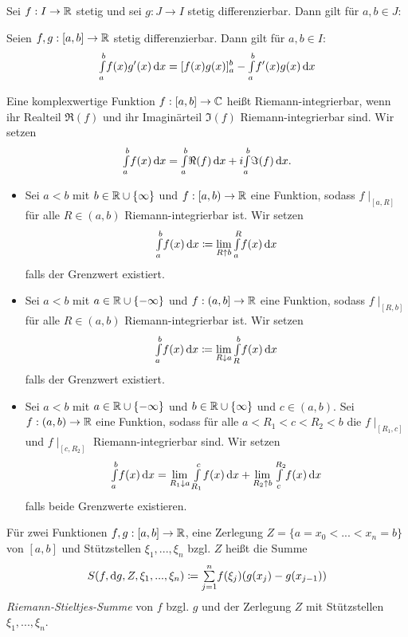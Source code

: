 \documentclass{cheat-sheet}
\begin{document}
\begin{satz}
Sei $f : I \to \mathbb{R}$ stetig und sei $g : J \to I$ stetig differenzierbar. Dann gilt für $a, b \in J$:
\end{satz}

\begin{satz}
Seien $f, g : [a, b] \to \mathbb{R}$ stetig differenzierbar. Dann gilt für $a, b \in I$:
\[ {\textstyle \int\limits_{a}^{b}} f(x)g'(x) \,\mathrm{d} x = [f(x)g(x)]_a^b - {\textstyle \int\limits_{a}^{b}} f'(x)g(x) \,\mathrm{d} x \]
\end{satz}

\begin{defn}
Eine komplexwertige Funktion $f : [a, b] \to \mathbb{C}$ heißt Riemann-integrierbar, wenn ihr Realteil $\Re(f)$ und ihr Imaginärteil $\Im(f)$ Riemann-integrierbar sind. Wir setzen
\[ {\textstyle \int\limits_{a}^{b}} f(x) \,\mathrm{d} x = {\textstyle \int\limits_{a}^{b}} \Re(f) \,\mathrm{d} x + i {\textstyle \int\limits_{a}^{b}} \Im(f) \,\mathrm{d} x. \]
\end{defn}

\begin{defn}
\begin{itemize}
  \item Sei $a < b$ mit $b \in \mathbb{R} \cup \{ \infty \}$ und $f : [a, b) \to \mathbb{R}$ eine Funktion, sodass $f\mid_[a, R]$ für alle $R \in (a, b)$ Riemann-integrierbar ist. Wir setzen
  \[ {\textstyle \int\limits_{a}^{b}} f(x) \,\mathrm{d} x \coloneqq \lim_{R \uparrow b} {\textstyle \int\limits_{a}^{R}} f(x) \,\mathrm{d} x \]
  falls der Grenzwert existiert.
  \item Sei $a < b$ mit $a \in \mathbb{R} \cup \{ -\infty \}$ und $f : (a, b] \to \mathbb{R}$ eine Funktion, sodass $f\mid_[R, b]$ für alle $R \in (a, b)$ Riemann-integrierbar ist. Wir setzen
  \[ {\textstyle \int\limits_{a}^{b}} f(x) \,\mathrm{d} x \coloneqq \lim_{R \downarrow a} {\textstyle \int\limits_{R}^{b}} f(x) \,\mathrm{d} x \]
  falls der Grenzwert existiert.
  \item Sei $a < b$ mit $a \in \mathbb{R} \cup \{ -\infty \}$ und $b \in \mathbb{R} \cup \{ \infty \}$ und $c \in (a, b)$. Sei $f : (a, b) \to \mathbb{R}$ eine Funktion, sodass für alle $a < R_1 < c < R_2 < b$ die $f\mid_{[R_1, c]}$ und $f\mid_{[c, R_2]}$ Riemann-integrierbar sind. Wir setzen
  \[ {\textstyle \int\limits_{a}^{b}} f(x) \,\mathrm{d} x = \lim_{R_1 \downarrow a} {\textstyle \int\limits_{R_1}^{c}} f(x) \,\mathrm{d} x + \lim_{R_2 \uparrow b} {\textstyle \int\limits_{c}^{R_2}} f(x) \,\mathrm{d} x \]
  falls beide Grenzwerte existieren.
\end{itemize}
\end{defn}


\begin{defn}
Für zwei Funktionen $f, g : [a, b] \to \mathbb{R}$, eine Zerlegung $Z = \{ a = x_0 < ... < x_n = b \}$ von $[a, b]$ und Stützstellen $\xi_1, ..., \xi_n$ bzgl. $Z$ heißt die Summe
\[ S(f, \d g, Z, \xi_1, ..., \xi_n) \coloneqq \sum_{j=1}^{n}\!f(\xi_j)(g(x_j) - g(x_{j{-}1})) \]
\emph{Riemann-Stieltjes-Summe} von $f$ bzgl. $g$ und der Zerlegung $Z$ mit Stützstellen $\xi_1, ..., \xi_n$.
\end{defn}
\end{document}
